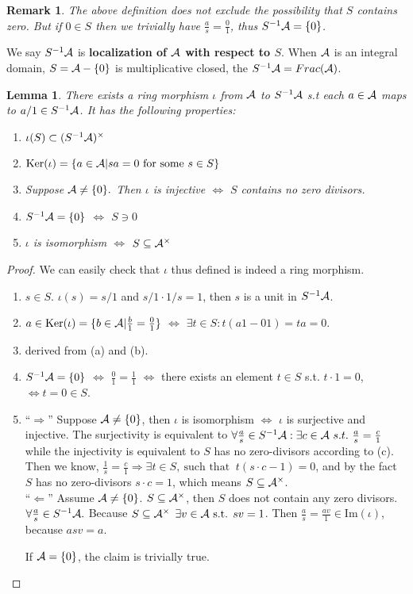 \documentclass[11pt]{article}
\newtheorem{lemma}[thm]{Lemma}
\newtheorem{rmk}[thm]{Remark}
\newcommand{\cala}{{\cal A}}
\newcommand{\Lrta}{\Longrightarrow}
\newcommand{\Llta}{\Longleftarrow}
\newcommand{\Llrta}{\Longleftrightarrow}
\begin{document}
\begin{rmk}
The above definition does not exclude the possibility that $S$ contains zero. But if $0\in S$ then we trivially have $\frac{a}{s}=\frac{0}{1}$, thus $S^{-1}\cala=\{0\}$.
\end{rmk}

We say $S^{-1}\cala$ is \textbf{localization of $\cala$ with respect to $S$}.
When $\cala$ is an integral domain, $S=\cala-\{0\}$ is multiplicative closed, the $S^{-1}\cala=Frac(\cala)$.
\begin{lemma}\label{lem:localization_inj_surj_iso}
There exists a ring morphism $\iota$ from $\cala$ to $S^{-1}\cala$ s.t each $a\in \cala$ maps to $a/1\in S^{-1}\cala$.
It has the following properties:
\begin{enumerate}[label=(\alph*)]
\item $\iota(S)\subset (S^{-1}\cala)^{\times}$
\item $\text{Ker}(\iota)=\{a\in \cala|sa=0 \text{ for some }s\in S\}$
\item Suppose $\cala\neq\{0\}.$ Then $\iota$ is injective $\Longleftrightarrow$ $S$ contains no zero divisors.
\item $S^{-1}\cala=\{0\}$ $\Longleftrightarrow$ $S\ni 0$
\item $\iota$ is isomorphism  $\Longleftrightarrow $ $S\subseteq \cala^{\times}$
\end{enumerate}
\end{lemma}
\begin{proof}We can easily check that $\iota$ thus defined is indeed a ring morphism.
\begin{enumerate}[label=(\alph*)]
\item  $s\in S$. $\iota(s)=s/1$ and $s/1\cdot 1/s=1$, then $s$ is a unit in $S^{-1}\cala$.
\item $a\in \text{Ker}(\iota)=\{b\in \cala|\frac{b}{1}=\frac{0}{1}\}$ $\Longleftrightarrow$ $\exists t\in S: t(a1-01)=ta=0.$
\item  derived from (a) and (b).
\item $S^{-1}\cala=\{0\}$ $\Longleftrightarrow$ $\frac{0}{1}=\frac{1}{1}$ $\Llrta$  there exists an element $t\in S$ s.t. $t\cdot1=0$, $\Longleftrightarrow t=0\in S$.
\item ``$\Lrta$'' Suppose $\cala\neq \{0\}$, then $\iota $ is isomorphism $\Llrta$  $\iota$ is surjective and injective. The surjectivity is equivalent to $\forall \frac{a}{s}\in S^{-1}\cala: \exists c\in \cala\ s.t.\ \frac{a}{s}=\frac{c}{1}$ while the injectivity is equivalent to $S$ has no zero-divisors  according to (c). Then we know, $\frac{1}{s}=\frac{c}{1}\Lrta\exists t\in S,\ \text{such that }\  t(s\cdot c-1)=0$, and by the fact $S$ has no zero-divisors  $s\cdot c=1$, which means $S\subseteq \cala^{\times}$.\\
``$\Llta$'' Assume $\cala\neq\{0\}$. $S\subseteq\cala^\times$, then $S$ does not contain any zero divisors. $\forall \frac{a}{s}\in S^{-1}\cala.$ Because $S\subseteq\cala^\times$ $ \exists v\in \cala \text{ s.t. } sv=1$. Then $ \frac{a}{s}=\frac{av}{1}\in \text{Im}(\iota)$, because $a s v=a$.

If $\cala=\{0\}$, the claim is trivially true.
\end{enumerate}
\end{proof}
\end{document}
